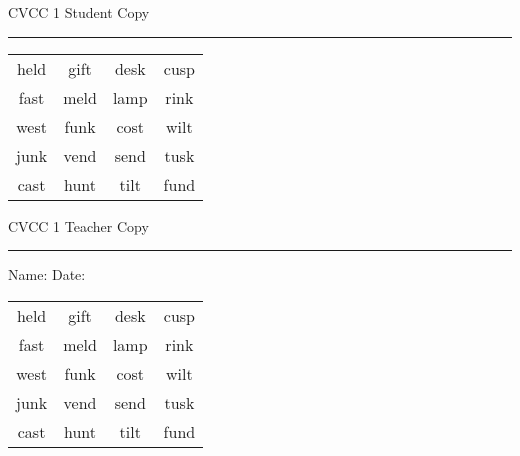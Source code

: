 \documentclass{memoir}
\begin{document}

\footnotesize \noindent
CVCC 1 \hfill Student Copy
\smallskip
\hrule

\Large

\setlength{\tabcolsep}{14pt}
\def\arraystretch{3}

{\selectfont


\begin{vplace}[0.5]
\begin{center}
\begin{tabular}{cccc}
held & gift & desk & cusp \\
fast & meld & lamp & rink \\
west & funk & cost & wilt \\
junk & vend & send & tusk \\
cast & hunt & tilt & fund \\
\end{tabular}
\end{center}
\end{vplace}

}

\newpage

\footnotesize \noindent
CVCC 1 \hfill Teacher Copy
\smallskip
\hrule

\small

\vfill

\noindent
Name: \underline{\hspace{1.75in}} \hfill Date: \underline{\hspace{1in}}

\Large

{\selectfont


\begin{vplace}[0.5]
\begin{center}
\begin{tabular}{cccc}
held & gift & desk & cusp \\
fast & meld & lamp & rink \\
west & funk & cost & wilt \\
junk & vend & send & tusk \\
cast & hunt & tilt & fund \\
\end{tabular}
\end{center}
\end{vplace}



}
\end{document}
